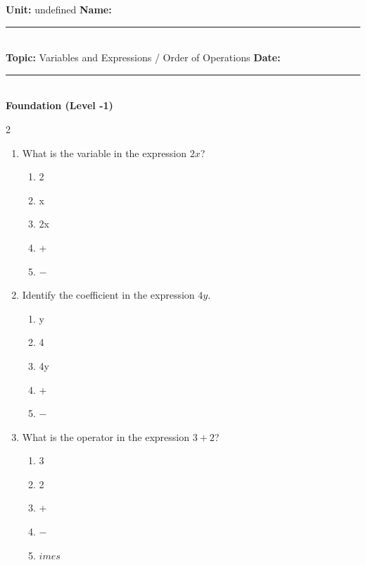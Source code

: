 \documentclass[10pt]{article}
\begin{document}
\enlargethispage{2.5cm}

\begin{tcolorbox}[colback=mainblue!5, colframe=mainblue, sharp corners, boxrule=0.5pt]
    \small \textbf{Unit:} undefined \hfill \textbf{Name:} \rule{3cm}{0.4pt} \\
    \small \textbf{Topic:} Variables and Expressions / Order of Operations \hfill \textbf{Date:} \rule{2cm}{0.4pt} \\
    \centering \textbf{\large Foundation (Level -1)}
\end{tcolorbox}

\vspace{0.2cm}

\begin{multicols}{2}
\begin{enumerate}[label=\textbf{Q\arabic*.}, leftmargin=*, itemsep=6pt, parsep=0pt]

  \item \small What is the variable in the expression $2x$?
  \begin{enumerate}[label=(\Alph*), leftmargin=0.6cm, nosep, itemsep=2pt]
    \item 2
    \item x
    \item 2x
    \item +
    \item $-$
  \end{enumerate}

  \item \small Identify the coefficient in the expression $4y$.
  \begin{enumerate}[label=(\Alph*), leftmargin=0.6cm, nosep, itemsep=2pt]
    \item y
    \item 4
    \item 4y
    \item $+$
    \item $-$
  \end{enumerate}

  \item \small What is the operator in the expression $3 + 2$?
  \begin{enumerate}[label=(\Alph*), leftmargin=0.6cm, nosep, itemsep=2pt]
    \item 3
    \item 2
    \item $+$
    \item $-$
    \item $	imes$
  \end{enumerate}


\end{enumerate}
\end{multicols}
\end{document}
